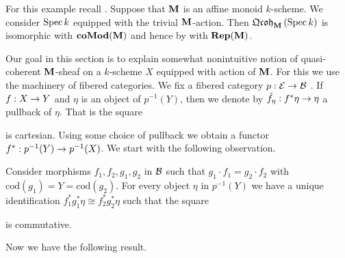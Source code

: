 \begin{example}\label{example:equivariant_sheaves_on_points}
For this example recall \cite{Monoid_k_functors}. Suppose that $\mathbf{M}$ is an affine monoid $k$-scheme. We consider $\mathrm{Spec}\, k$ equipped with the trivial $\mathbf{M}$-action. Then $\mathfrak{Qcoh}_{\mathbf{M}}\left(\mathrm{Spec}\, k\right)$ is isomorphic with $\mathbf{co}\mathbf{Mod}(\mathbf{M})$ and hence by {\cite[Theorem 15.1]{Monoid_k_functors}} with $\mathbf{Rep}(\mathbf{M})$.
\end{example}
\noindent
Our goal in this section is to explain somewhat nonintuitive notion of quasi-coherent $\mathbf{M}$-sheaf on a $k$-scheme $X$ equipped with action of $\mathbf{M}$. For this we use the machinery of fibered categories. We fix a fibered category $p:{\mathcal E} \rightarrow {\mathcal B}$ . If $f:X\rightarrow Y$ and $\eta$ is an object of $p^{-1}(Y)$, then we denote by $\tilde{f}_{\eta}:f^*\eta\rightarrow \eta$ a pullback of $\eta$. That is the square
\begin{center}
\end{center}
is cartesian. Using some choice of pullback we obtain a functor $f^*:p^{-1}(Y)\rightarrow p^{-1}(X)$. We start with the following observation.

\begin{remark}\label{remark:unique_identification}
Consider morphisms $f_1,f_2,g_1,g_2$ in ${\mathcal B}$ such that $g_1\cdot f_1 = g_2\cdot f_2$ with $\mathrm{cod}(g_1) = Y = \mathrm{cod}(g_2)$. For every object $\eta$ in $p^{-1}(Y)$ we have a unique identification $f_1^*g_1^*\eta \cong f_2^*g_2^*\eta$ such that the square
\begin{center}
\end{center}
is commutative.
\end{remark}
\noindent
Now we have the following result.

